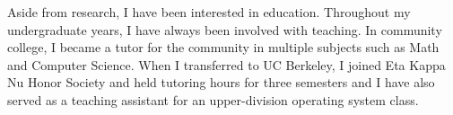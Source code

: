 \documentclass[12pt]{article}
\begin{document}
%
%

Aside from research, I have been interested in education. Throughout my undergraduate years, I have always been involved with teaching. In community college, I became a tutor for the community in multiple subjects such as Math and Computer Science. When I transferred to UC Berkeley, I joined Eta Kappa Nu Honor Society and held tutoring hours for three semesters and I have also served as a teaching assistant for an upper-division operating system class. \newline
\end{document}
